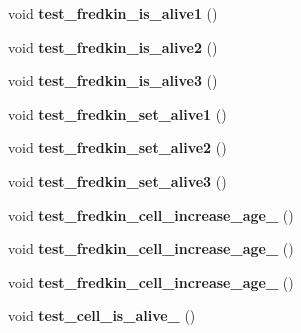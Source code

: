 \begin{DoxyCompactItemize}
\item 
\hypertarget{structTestLife_a5af321b59e03cd9141207ff08419d2cd}{void {\bfseries test\-\_\-fredkin\-\_\-is\-\_\-alive1} ()}\label{structTestLife_a5af321b59e03cd9141207ff08419d2cd}

\item 
\hypertarget{structTestLife_aee706fb091d86cafd8d33dcffd092c46}{void {\bfseries test\-\_\-fredkin\-\_\-is\-\_\-alive2} ()}\label{structTestLife_aee706fb091d86cafd8d33dcffd092c46}

\item 
\hypertarget{structTestLife_a2d3dd39fdd57579f585ccf69e50ea714}{void {\bfseries test\-\_\-fredkin\-\_\-is\-\_\-alive3} ()}\label{structTestLife_a2d3dd39fdd57579f585ccf69e50ea714}

\item 
\hypertarget{structTestLife_a5a6c60a1cee78198f13d41b2cf8b0139}{void {\bfseries test\-\_\-fredkin\-\_\-set\-\_\-alive1} ()}\label{structTestLife_a5a6c60a1cee78198f13d41b2cf8b0139}

\item 
\hypertarget{structTestLife_ad9a32a37fdd7dbe418bfd14b6fab36d7}{void {\bfseries test\-\_\-fredkin\-\_\-set\-\_\-alive2} ()}\label{structTestLife_ad9a32a37fdd7dbe418bfd14b6fab36d7}

\item 
\hypertarget{structTestLife_af221ae2ea7f90ceac3da748f4fb8983b}{void {\bfseries test\-\_\-fredkin\-\_\-set\-\_\-alive3} ()}\label{structTestLife_af221ae2ea7f90ceac3da748f4fb8983b}

\item 
\hypertarget{structTestLife_ab05c22d10774468fd15987b1073a7554}{void {\bfseries test\-\_\-fredkin\-\_\-cell\-\_\-increase\-\_\-age\-\_} ()}\label{structTestLife_ab05c22d10774468fd15987b1073a7554}

\item 
\hypertarget{structTestLife_a08dff48a597b404cf0d02e0f80842dfd}{void {\bfseries test\-\_\-fredkin\-\_\-cell\-\_\-increase\-\_\-age\-\_} ()}\label{structTestLife_a08dff48a597b404cf0d02e0f80842dfd}

\item 
\hypertarget{structTestLife_a5c94aae36ddda99dfa18e03b56d181fe}{void {\bfseries test\-\_\-fredkin\-\_\-cell\-\_\-increase\-\_\-age\-\_} ()}\label{structTestLife_a5c94aae36ddda99dfa18e03b56d181fe}

\item 
\hypertarget{structTestLife_aa7adef992397192aa25f2a01fece6b25}{void {\bfseries test\-\_\-cell\-\_\-is\-\_\-alive\-\_} ()}\label{structTestLife_aa7adef992397192aa25f2a01fece6b25}


\end{DoxyCompactItemize}
